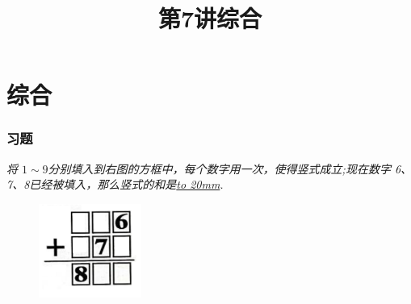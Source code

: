 \section{综合}

\title[第7讲\quad 综合]{第7讲\quad 综合} 
\author{}
\date{}

\begin{frame}
    \titlepage
\end{frame}

\setcounter{framecounter}{0}



\begin{frame}
    \frametitle{习题\theframecounter}
    \textit{将 $1\sim 9$分别填入到右图的方框中，每个数字用一次，使得竖式成立;现在数字 6、7、8已经被填入，那么竖式的和是\underline{\hbox to 20mm{}}.}
    \begin{figure}[H] 
        \centering
        \includegraphics[width=0.3\textwidth]{./pics/Chapter_7/3.png}
    \end{figure}
\end{frame}

